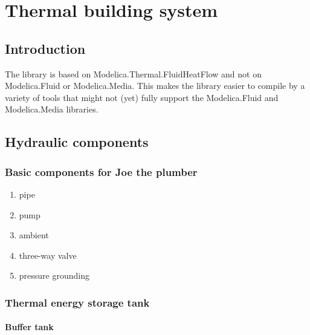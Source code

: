 
\chapter{Thermal building system}



\section{Introduction}

The library is based on Modelica.Thermal.FluidHeatFlow and not on Modelica.Fluid or Modelica.Media.  This makes the library easier to compile by a variety of tools that might not (yet) fully support the  Modelica.Fluid and Modelica.Media libraries.

\section{Hydraulic components}

\subsection{Basic components for Joe the plumber}

\begin{enumerate}
	\item pipe
	\item pump
	\item ambient
	\item three-way valve
	\item pressure grounding
\end{enumerate}

\subsection{Thermal energy storage tank}

\subsubsection{Buffer tank}

